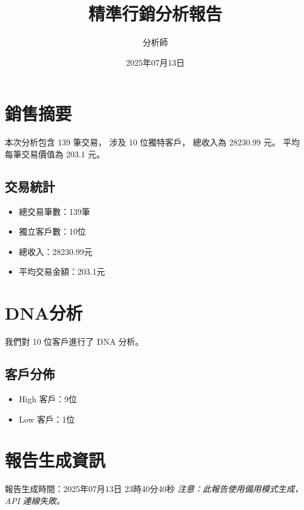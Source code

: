 \documentclass{article}
\title{精準行銷分析報告}
\author{分析師}
\date{2025年07月13日}
\begin{document}
\maketitle

\section{銷售摘要}
本次分析包含 139 筆交易，
涉及 10 位獨特客戶，
總收入為 28230.99 元。
平均每筆交易價值為 203.1 元。

\subsection{交易統計}
\begin{itemize}
\item 總交易筆數：139筆
\item 獨立客戶數：10位
\item 總收入：28230.99元
\item 平均交易金額：203.1元
\end{itemize}

\section{DNA分析}
我們對 10 位客戶進行了 DNA 分析。

\subsection{客戶分佈}
\begin{itemize}
\item High 客戶：9位
\item Low 客戶：1位
\end{itemize}

\section{報告生成資訊}
報告生成時間：2025年07月13日 23時40分40秒
\textit{注意：此報告使用備用模式生成，API 連線失敗。}




\end{document}
